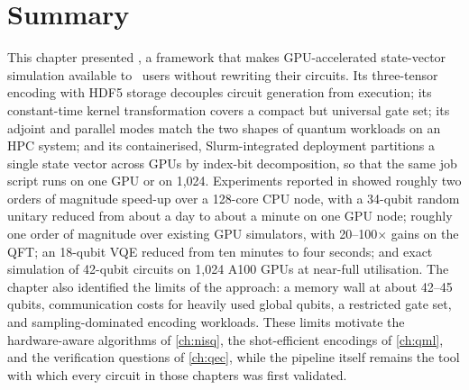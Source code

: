 \section{Summary}\label{sec:qgear:summary}

This chapter presented \qgear, a framework that makes GPU-accelerated state-vector simulation available to \qiskit\ users without rewriting their circuits. Its three-tensor encoding with HDF5 storage decouples circuit generation from execution; its constant-time kernel transformation covers a compact but universal gate set; its adjoint and parallel modes match the two shapes of quantum workloads on an HPC system; and its containerised, Slurm-integrated deployment partitions a single state vector across GPUs by index-bit decomposition, so that the same job script runs on one GPU or on 1,024. Experiments reported in \cite{guo2025qgear} showed roughly two orders of magnitude speed-up over a 128-core CPU node, with a 34-qubit random unitary reduced from about a day to about a minute on one GPU node; roughly one order of magnitude over existing GPU simulators, with 20--100$\times$ gains on the QFT; an 18-qubit VQE reduced from ten minutes to four seconds; and exact simulation of 42-qubit circuits on 1,024 A100 GPUs at near-full utilisation. The chapter also identified the limits of the approach: a memory wall at about 42--45 qubits, communication costs for heavily used global qubits, a restricted gate set, and sampling-dominated encoding workloads. These limits motivate the hardware-aware algorithms of \cref{ch:nisq}, the shot-efficient encodings of \cref{ch:qml}, and the verification questions of \cref{ch:qec}, while the pipeline itself remains the tool with which every circuit in those chapters was first validated.
